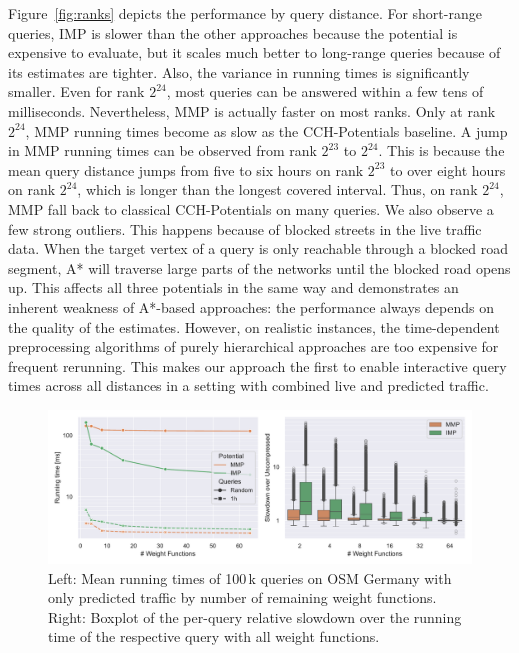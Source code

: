 \documentclass[a4paper,UKenglish,cleveref, autoref, thm-restate,anonymous]{lipics-v2021}
\begin{document}
Figure~\ref{fig:ranks} depicts the performance by query distance.
For short-range queries, IMP is slower than the other approaches because the potential is expensive to evaluate, but it scales much better to long-range queries because of its estimates are tighter.
Also, the variance in running times is significantly smaller.
Even for rank $2^{24}$, most queries can be answered within a few tens of milliseconds.
Nevertheless, MMP is actually faster on most ranks.
Only at rank $2^{24}$, MMP running times become as slow as the CCH-Potentials baseline.
A jump in MMP running times can be observed from rank $2^{23}$ to $2^{24}$.
This is because the mean query distance jumps from five to six hours on rank $2^{23}$ to over eight hours on rank $2^{24}$, which is longer than the longest covered interval.
Thus, on rank $2^{24}$, MMP fall back to classical CCH-Potentials on many queries.
We also observe a few strong outliers.
This happens because of blocked streets in the live traffic data.
When the target vertex of a query is only reachable through a blocked road segment, A* will traverse large parts of the networks until the blocked road opens up.
This affects all three potentials in the same way and demonstrates an inherent weakness of A*-based approaches: the performance always depends on the quality of the estimates.
However, on realistic instances, the time-dependent preprocessing algorithms of purely hierarchical approaches are too expensive for frequent rerunning.
This makes our approach the first to enable interactive query times across all distances in a setting with combined live and predicted traffic.

\begin{figure}[!t]
\centering
\includegraphics[width=\linewidth]{fig/compression.pdf}
\caption{
Left: Mean running times of 100\,k queries on OSM Germany with only predicted traffic by number of remaining weight functions.
Right: Boxplot of the per-query relative slowdown over the running time of the respective query with all weight functions.
}\label{fig:compression}
\end{figure}
\end{document}
